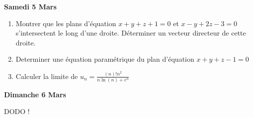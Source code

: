 \documentclass[a4paper, 11pt,reqno]{article}
\begin{document}
\begin{center}
\textbf{Samedi  5  Mars}
\end{center}

\begin{enumerate}
\item Montrer que les plans d'équation $x+y+z+1=0$ et $x-y+2z-3=0$ s'intersectent le long d'une droite.  Déterminer un vecteur directeur de cette droite. 
\item Determiner une équation paramétrique du plan d'équation $x+y+z-1=0$
\item Calculer la limite de $u_n=\frac{(n)! n^2}{n\ln(n)+e^n}$
\end{enumerate}

\begin{center}
\textbf{Dimanche  6  Mars}
\end{center}
\begin{center}
DODO ! 
\end{center}
\end{document}

